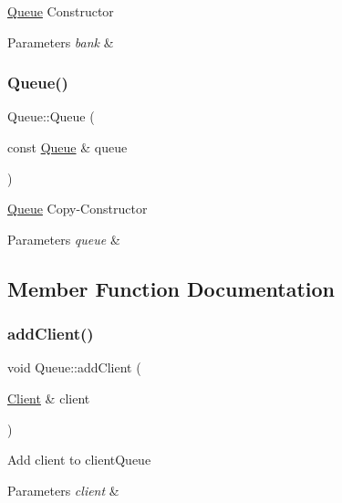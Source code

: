\hyperlink{classQueue}{Queue} Constructor 
\begin{DoxyParams}{Parameters}
{\em bank} & \\
\hline
\end{DoxyParams}
\mbox{\label{classQueue_a4d325dcdfe0550824d529b7aa11535b8}} 
\subsubsection{\texorpdfstring{Queue()}{Queue()}\hspace{0.1cm}{\footnotesize\ttfamily [2/2]}}
{\footnotesize\ttfamily Queue\+::\+Queue (\begin{DoxyParamCaption}\item[{const \hyperlink{classQueue}{Queue} \&}]{queue }\end{DoxyParamCaption})}

\hyperlink{classQueue}{Queue} Copy-\/\+Constructor 
\begin{DoxyParams}{Parameters}
{\em queue} & \\
\hline
\end{DoxyParams}


\subsection{Member Function Documentation}
\mbox{\label{classQueue_aa4545b1d42237801b75e0f20c3cc0587}} 
\subsubsection{\texorpdfstring{add\+Client()}{addClient()}}
{\footnotesize\ttfamily void Queue\+::add\+Client (\begin{DoxyParamCaption}\item[{\hyperlink{classClient}{Client} \&}]{client }\end{DoxyParamCaption})}

Add client to client\+Queue 
\begin{DoxyParams}{Parameters}
{\em client} & \\
\hline
\end{DoxyParams}
\mbox{\label{classQueue_afc73e60fa330498b5efdbf267d4508c2}} 
